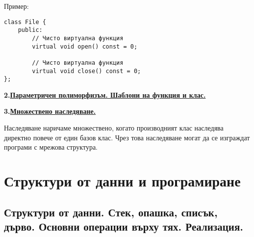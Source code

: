 \documentclass{article}
\begin{document}
Пример:
\begin{lstlisting}
class File {
    public:
        // Чисто виртуална функция
        virtual void open() const = 0;

        // Чисто виртуална функция
        virtual void close() const = 0;
};
\end{lstlisting}

\textbf{2.\underline{Параметричен полиморфизъм. Шаблони на функция и клас.}} \newline



\textbf{3.\underline{Множествено наследяване.}} \newline

Наследяване наричаме множествено, когато производният клас наследява директно повече от един базов клас. Чрез това наследяване
могат да се изграждат програми с мрежова структура. 

\section*{Структури от данни и програмиране}

\subsection*{Структури от данни. Стек, опашка, списък, дърво. Основни операции върху тях. Реализация.}
\end{document}
